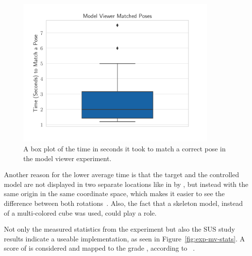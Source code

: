 \begin{figure}[H]
	\centering
	\includegraphics[width=10cm]{figures/evaluation/eval_exp_mv.pdf}
	\caption[Model viewer task results]{A box plot of the time in seconds it took to match a correct pose in the model viewer experiment.}\label{fig:eval-exp-mv}
\end{figure}

Another reason for the lower average time is that the target and the controlled model are not displayed in two separate locations like in {} by \citeauthor{Katzakis.2010}, but instead with the same origin in the same coordinate space, which makes it easier to see the difference between both rotations~\cite[140]{Katzakis.2010}. Also, the fact that a skeleton model, instead of a multi-colored cube was used, could play a role.

Not only the measured statistics from the experiment but also the \gls{SUS} study results indicate a useable implementation, as seen in Figure~\ref{fig:exp-mv-stats}. A score of \evalExpMvSusScore{} is considered \evalExpMvSusAdj{} and mapped to the grade \evalExpMvSusGrade, according to \citeauthor{Bangor.2009}~\cite[120\psq]{Bangor.2009}.

